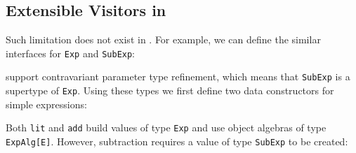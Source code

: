\begin{comment}
However,
such subtyping relation does not fit well in Scala because inheritance implies
subtyping in such languages \footnote{It is still possible to encode
  contravariant parameter types in Scala but doing so would require some
  technique.\bruno{what technique?}}. As \lstinline{SubExp[E]} extends
\lstinline{Exp[E]}, the former becomes a subtype of the latter. This suffers
from the ``Inheritance is Not Subtyping'' problem.
\end{comment}

\subsection{Extensible Visitors in \name}
Such limitation does not exist in \name. For example, we can define the similar
interfaces for \lstinline{Exp} and \lstinline{SubExp}:
\begin{comment}
  \begin{lstlisting}{language=F2J}
    type Exp    = {
      accept: forall A. ExpAlg[A] -> A
    };
    type SubExp = {
      accept: forall A. SubExpAlg[A] -> A
    };
  \end{lstlisting}
\end{comment}
\name support contravariant parameter type refinement, which means that
\lstinline{SubExp} is a supertype of \lstinline{Exp}. Using these
types we first define two data constructors for simple expressions:
\begin{comment}
  \begin{lstlisting}{language=F2J}
    let lit (n: Int): Exp = {
      accept = /\E -> \(f: ExpAlg[E]) -> f.lit n
    };
    let add (e1: Exp) (e2: Exp): Exp = {
      accept = /\E -> \(f: ExpAlg[E]) ->
      f.add (e1.accept[E] f) (e2.accept[E] f)
    };
  \end{lstlisting}
\end{comment}

\noindent Both \lstinline{lit} and \lstinline{add} build values of type
\lstinline{Exp} and use object algebras of type \lstinline{ExpAlg[E]}.
However, subtraction requires a value of type \lstinline{SubExp} to be created:
\begin{comment}
  \begin{lstlisting}{language=F2J}
    let sub (e1: SubExp) (e2: SubExp): SubExp ={
      accept = /\E -> \(f : SubExpAlg[E]) ->
      f.sub (e1.accept[E] f) (e2.accept[E] f)
    };
  \end{lstlisting}
\end{comment}

